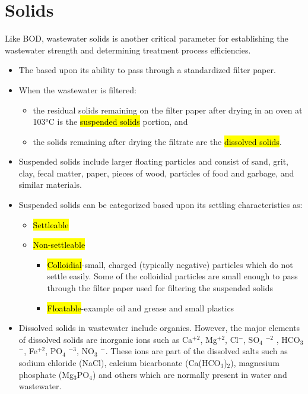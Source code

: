 \section{Solids}
		Like BOD, wastewater solids is another critical parameter for establishing the wastewater strength and determining treatment process efficiencies. 
		\begin{itemize}
			\item The  based upon its ability to pass through a standardized filter paper.
			\item When the wastewater is filtered:
			      \begin{itemize}
			      	\item the residual solids remaining on the filter paper after drying in an oven at 103\si{\degree}C is the \hl{suspended solids} portion, and 
			      	\item the solids remaining after drying the filtrate are the \hl{dissolved solids}.
			      \end{itemize}
			\item Suspended solids include larger floating particles and consist of sand, grit, clay, fecal matter, paper, pieces of wood, particles of food and garbage, and similar materials.
			\item Suspended solids can be categorized based upon its settling characteristics as:
			      \begin{itemize}
			      	\item \hl{Settleable}
			      	\item \hl{Non-settleable}
			      	      \begin{itemize}
			      	      	\item \hl{Colloidial}-small, charged (typically negative) particles which do not settle easily.  Some of the colloidial particles are small enough to pass through the filter paper used for filtering the suspended solids
			      	      	\item \hl{Floatable}-example oil and grease and small plastics
			      	      \end{itemize}
			      \end{itemize}
			\item Dissolved solids in wastewater include organics.  However, the major elements of dissolved solids are inorganic ions such as Ca$^{+2}$, Mg$^{+2}$, Cl$^-$, SO$_4$ $^{-2}$ , HCO$_3$ $^-$, Fe$^{+2}$, PO$_4$ $^{-3}$, NO$_3$ $^-$.  These ions are part of the dissolved salts such as sodium chloride (NaCl), calcium bicarbonate (Ca(HCO$_3$)$_2$), magnesium phosphate (Mg$_3$PO$_4$) and others which are normally present in water and wastewater. 

\end{itemize}

